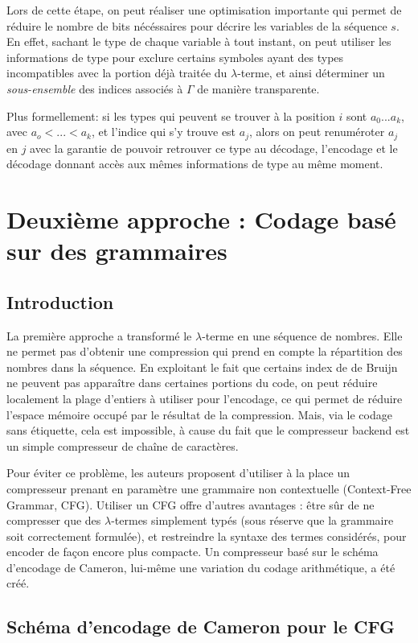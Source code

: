 \documentclass[titlepage]{article}
\begin{document}
Lors de cette étape, on peut réaliser une optimisation importante qui permet de
réduire le nombre de bits nécéssaires pour décrire les variables de la séquence $s$.
En effet, sachant le type de chaque variable à tout instant, on peut utiliser les informations
de type pour exclure certains symboles ayant des types incompatibles avec la portion déjà
traitée du $\lambda$-terme, et ainsi déterminer un \emph{sous-ensemble} des indices associés à $\Gamma$
de manière transparente.

Plus formellement: si les types qui peuvent se trouver à la position $i$ sont ${a_0 ... a_k}$,
avec $a_o < ... < a_k$, et l'indice qui s'y trouve est $a_j$, alors on peut renuméroter
$a_j$ en $j$ avec la garantie de pouvoir retrouver ce type au décodage, l'encodage et
le décodage donnant accès aux mêmes informations de type au même moment.

\section{Deuxième approche : Codage basé sur des grammaires}
\subsection{Introduction}
La première approche a transformé le $\lambda$-terme en une séquence de nombres. Elle ne permet pas d'obtenir une compression qui prend en compte la répartition des nombres dans la séquence. En exploitant le fait que certains index de de Bruijn ne peuvent pas apparaître dans certaines portions du code, on peut réduire localement la plage d'entiers à utiliser pour l'encodage, ce qui permet de réduire l'espace mémoire occupé par le résultat de la compression. Mais, via le codage sans étiquette, cela est impossible, à cause du fait que le compresseur backend est un simple compresseur de chaîne de caractères.

Pour éviter ce problème, les auteurs proposent d'utiliser à la place un compresseur prenant en paramètre une grammaire non contextuelle (Context-Free Grammar, CFG). Utiliser un CFG offre d'autres avantages : être sûr de ne compresser que des $\lambda$-termes simplement typés (sous réserve que la grammaire soit correctement formulée), et restreindre la syntaxe des termes considérés, pour encoder de façon encore plus compacte. Un compresseur basé sur le schéma d'encodage de Cameron, lui-même une variation du codage arithmétique, a été créé.

\subsection{Schéma d'encodage de Cameron pour le CFG}
\end{document}
